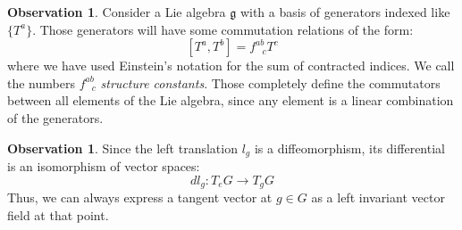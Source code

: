 \documentclass[12pt,a4paper]{report}
\theoremstyle{definition}
\theoremstyle{Theorem}
\theoremstyle{definition}
\theoremstyle{definition}
\newtheorem{Obs}[Def]{Observation}
\begin{document}
	\begin{Obs}
		Consider a Lie algebra $\mathfrak{g}$ with a basis of generators indexed like $\{T^a\}$. Those generators will have some commutation relations of the form:
		$$[T^a,T^b]=f^{ab}_{\hspace{9pt}c}T^c$$
		where we have used Einstein's notation for the sum of contracted indices. We call the numbers $f^{ab}_{\hspace{9pt}c}$ \textit{structure constants}. Those completely define the commutators between all elements of the Lie algebra, since any element is a linear combination of the generators.
	\end{Obs}
	\begin{Obs}
		Since the left translation $l_g$ is a diffeomorphism, its differential is an isomorphism of vector spaces:
		$$dl_g:T_eG\rightarrow T_gG$$
		Thus, we can always express a tangent vector at $g\in G$ as  a left invariant vector field at that point.
	\end{Obs}
\end{document}
